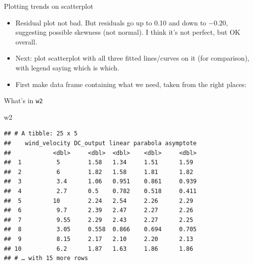 \documentclass[ignorenonframetext,]{beamer}
\newenvironment{Shaded}{\begin{snugshade}}{\end{snugshade}}
\newcommand{\DataTypeTok}[1]{\textcolor[rgb]{0.13,0.29,0.53}{#1}}
\newcommand{\FloatTok}[1]{\textcolor[rgb]{0.00,0.00,0.81}{#1}}
\newcommand{\KeywordTok}[1]{\textcolor[rgb]{0.13,0.29,0.53}{\textbf{#1}}}
\newcommand{\NormalTok}[1]{#1}
\newcommand{\OperatorTok}[1]{\textcolor[rgb]{0.81,0.36,0.00}{\textbf{#1}}}
\newcommand{\StringTok}[1]{\textcolor[rgb]{0.31,0.60,0.02}{#1}}
\providecommand{\tightlist}{%
  \setlength{\itemsep}{0pt}\setlength{\parskip}{0pt}}
\begin{document}
\begin{frame}[fragile]{Plotting trends on scatterplot}
\protect\hypertarget{plotting-trends-on-scatterplot}{}

\begin{itemize}
\tightlist
\item
  Residual plot not bad. But residuals go up to 0.10 and down to −0.20,
  suggesting possible skewness (not normal). I think it's not perfect,
  but OK overall.
\item
  Next: plot scatterplot with all three fitted lines/curves on it (for
  comparison), with legend saying which is which.
\item
  First make data frame containing what we need, taken from the right
  places:
\end{itemize}

\begin{Shaded}
\end{Shaded}

\end{frame}

\begin{frame}[fragile]{What's in \texttt{w2}}
\protect\hypertarget{whats-in-w2}{}

\begin{Shaded}
\begin{Highlighting}[]
\NormalTok{w2}
\end{Highlighting}
\end{Shaded}

\begin{verbatim}
## # A tibble: 25 x 5
##    wind_velocity DC_output linear parabola asymptote
##            <dbl>     <dbl>  <dbl>    <dbl>     <dbl>
##  1          5        1.58   1.34     1.51      1.59 
##  2          6        1.82   1.58     1.81      1.82 
##  3          3.4      1.06   0.951    0.861     0.939
##  4          2.7      0.5    0.782    0.518     0.411
##  5         10        2.24   2.54     2.26      2.29 
##  6          9.7      2.39   2.47     2.27      2.26 
##  7          9.55     2.29   2.43     2.27      2.25 
##  8          3.05     0.558  0.866    0.694     0.705
##  9          8.15     2.17   2.10     2.20      2.13 
## 10          6.2      1.87   1.63     1.86      1.86 
## # … with 15 more rows
\end{verbatim}

\end{frame}
\end{document}
